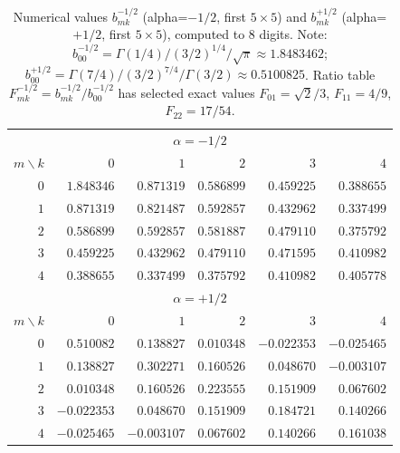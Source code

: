 \documentclass[11pt,a4paper]{article}
\theoremstyle{definition}
\theoremstyle{plain}
\begin{document}
\begin{table}[ht]
\centering
\caption{Numerical values $b_{mk}^{-1/2}$ (alpha=$-1/2$, first $5\times 5$)
and $b_{mk}^{+1/2}$ (alpha=$+1/2$, first $5\times 5$), computed to 8 digits.
Note: $b_{00}^{-1/2} = \Gamma(1/4)/(3/2)^{1/4}/\sqrt{\pi} \approx 1.8483462$;
$b_{00}^{+1/2} = \Gamma(7/4)/(3/2)^{7/4}/\Gamma(3/2) \approx 0.5100825$.
Ratio table $F_{mk}^{-1/2}=b_{mk}^{-1/2}/b_{00}^{-1/2}$ has selected
exact values $F_{01}=\sqrt{2}/3$, $F_{11}=4/9$, $F_{22}=17/54$.}
\label{tab:alpha-half}
\small
\begin{tabular}{r|rrrrr}
\toprule
\multicolumn{6}{c}{$\alpha=-1/2$} \\
$m\backslash k$ & $0$ & $1$ & $2$ & $3$ & $4$ \\
\midrule
$0$ & $1.848346$ & $0.871319$ & $0.586899$ & $0.459225$ & $0.388655$ \\
$1$ & $0.871319$ & $0.821487$ & $0.592857$ & $0.432962$ & $0.337499$ \\
$2$ & $0.586899$ & $0.592857$ & $0.581887$ & $0.479110$ & $0.375792$ \\
$3$ & $0.459225$ & $0.432962$ & $0.479110$ & $0.471595$ & $0.410982$ \\
$4$ & $0.388655$ & $0.337499$ & $0.375792$ & $0.410982$ & $0.405778$ \\
\midrule
\multicolumn{6}{c}{$\alpha=+1/2$} \\
$m\backslash k$ & $0$ & $1$ & $2$ & $3$ & $4$ \\
\midrule
$0$ & $0.510082$ & $0.138827$ & $0.010348$ & $-0.022353$ & $-0.025465$ \\
$1$ & $0.138827$ & $0.302271$ & $0.160526$ & $0.048670$ & $-0.003107$ \\
$2$ & $0.010348$ & $0.160526$ & $0.223555$ & $0.151909$ & $0.067602$ \\
$3$ & $-0.022353$ & $0.048670$ & $0.151909$ & $0.184721$ & $0.140266$ \\
$4$ & $-0.025465$ & $-0.003107$ & $0.067602$ & $0.140266$ & $0.161038$ \\
\bottomrule
\end{tabular}
\end{table}
\end{document}
